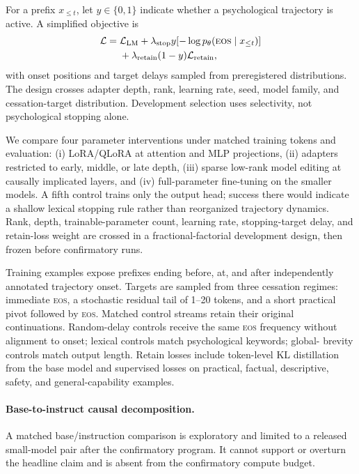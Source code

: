 \documentclass[10pt,twocolumn]{article}
\newcommand{\EOS}{\textsc{eos}}
\begin{document}
For a prefix $x_{\leq t}$, let $y\in\{0,1\}$ indicate whether a psychological
trajectory is active. A simplified objective is
\begin{equation}
\begin{split}
\mathcal{L}={}&\mathcal{L}_{\mathrm{LM}}+
\lambda_{\mathrm{stop}}y[-\log p_\theta(\EOS\mid x_{\leq t})]\\
&+\lambda_{\mathrm{retain}}(1-y)\mathcal{L}_{\mathrm{retain}},
\end{split}
\end{equation}
with onset positions and target delays sampled from preregistered distributions.
The design crosses adapter depth, rank, learning rate, seed, model family, and
cessation-target distribution. Development selection uses selectivity, not
psychological stopping alone.

We compare four parameter interventions under matched training tokens and
evaluation: (i) LoRA/QLoRA at attention and MLP projections, (ii) adapters
restricted to early, middle, or late depth, (iii) sparse low-rank model editing
at causally implicated layers, and (iv) full-parameter fine-tuning on the smaller
models. A fifth control trains only the output head; success there would indicate
a shallow lexical stopping rule rather than reorganized trajectory dynamics.
Rank, depth, trainable-parameter count, learning rate, stopping-target delay, and
retain-loss weight are crossed in a fractional-factorial development design,
then frozen before confirmatory runs.

Training examples expose prefixes ending before, at, and after independently
annotated trajectory onset. Targets are sampled from three cessation regimes:
immediate \EOS{}, a stochastic residual tail of 1--20 tokens, and a short
practical pivot followed by \EOS{}. Matched control streams retain their original
continuations. Random-delay controls receive the same \EOS{} frequency without
alignment to onset; lexical controls match psychological keywords; global-
brevity controls match output length. Retain losses include token-level KL
distillation from the base model and supervised losses on practical, factual,
descriptive, safety, and general-capability examples.

\paragraph{Base-to-instruct causal decomposition.}
A matched base/instruction comparison is exploratory and limited to a released
small-model pair after the confirmatory program. It cannot support or overturn
the headline claim and is absent from the confirmatory compute budget.
\end{document}
